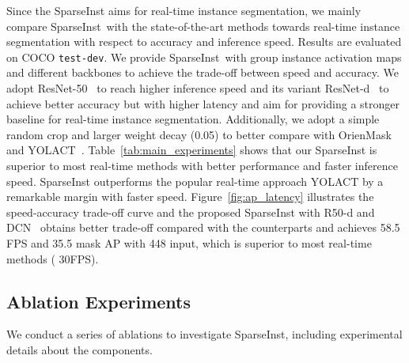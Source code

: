 \documentclass[10pt,twocolumn,letterpaper]{article}
\newcommand{\name}{SparseInst}
\begin{document}
Since the SparseInst aims for real-time instance segmentation, we mainly compare \name~with the state-of-the-art methods towards real-time instance segmentation with respect to accuracy and inference speed. Results are evaluated on COCO \texttt{test-dev}. 
We provide \name~with group instance activation maps and different backbones to achieve the trade-off between speed and accuracy. 
We adopt ResNet-50~\cite{HeZRS16} to reach higher inference speed and its variant ResNet-d~\cite{he2018bag} to achieve better accuracy but with higher latency and aim for providing a stronger baseline for real-time instance segmentation.
Additionally, we adopt a simple random crop and larger weight decay (0.05) to better compare with OrienMask~\cite{orien_maskabs-2106-12204} and YOLACT~\cite{YolactBolyaZXL19}.
Table~\ref{tab:main_experiments} shows that our \name{} is superior to most real-time methods with better performance and faster inference speed.
SparseInst outperforms the popular real-time approach YOLACT by a remarkable margin with faster speed. 
Figure~\ref{fig:ap_latency} illustrates the speed-accuracy trade-off curve and the proposed SparseInst with R50-d and DCN~\cite{DCNZhuHLD19} obtains better trade-off compared with the counterparts and achieves 58.5 FPS and 35.5 mask AP with 448 input, which is superior to most real-time methods ( 30FPS).







\subsection{Ablation Experiments}
We conduct a series of ablations to investigate \name, including experimental details about the components.
\end{document}
